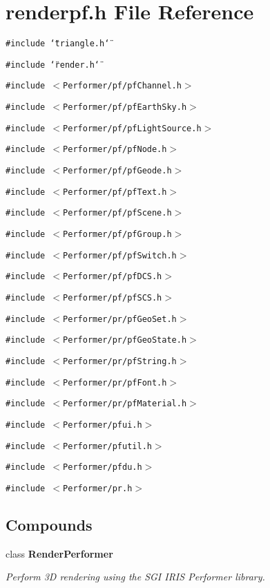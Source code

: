 \section{renderpf.h File Reference}
\label{renderpf_8h}
{\tt \#include \char`\"{}triangle.h\char`\"{}}\par
{\tt \#include \char`\"{}render.h\char`\"{}}\par
{\tt \#include $<$Performer/pf/pf\-Channel.h$>$}\par
{\tt \#include $<$Performer/pf/pf\-Earth\-Sky.h$>$}\par
{\tt \#include $<$Performer/pf/pf\-Light\-Source.h$>$}\par
{\tt \#include $<$Performer/pf/pf\-Node.h$>$}\par
{\tt \#include $<$Performer/pf/pf\-Geode.h$>$}\par
{\tt \#include $<$Performer/pf/pf\-Text.h$>$}\par
{\tt \#include $<$Performer/pf/pf\-Scene.h$>$}\par
{\tt \#include $<$Performer/pf/pf\-Group.h$>$}\par
{\tt \#include $<$Performer/pf/pf\-Switch.h$>$}\par
{\tt \#include $<$Performer/pf/pf\-DCS.h$>$}\par
{\tt \#include $<$Performer/pf/pf\-SCS.h$>$}\par
{\tt \#include $<$Performer/pr/pf\-Geo\-Set.h$>$}\par
{\tt \#include $<$Performer/pr/pf\-Geo\-State.h$>$}\par
{\tt \#include $<$Performer/pr/pf\-String.h$>$}\par
{\tt \#include $<$Performer/pr/pf\-Font.h$>$}\par
{\tt \#include $<$Performer/pr/pf\-Material.h$>$}\par
{\tt \#include $<$Performer/pfui.h$>$}\par
{\tt \#include $<$Performer/pfutil.h$>$}\par
{\tt \#include $<$Performer/pfdu.h$>$}\par
{\tt \#include $<$Performer/pr.h$>$}\par
\subsection*{Compounds}
\begin{CompactItemize}
\item 
class {\bf Render\-Performer}
\begin{CompactList}\small\item\em Perform 3D rendering using the SGI IRIS Performer library.\item\end{CompactList}\end{CompactItemize}
